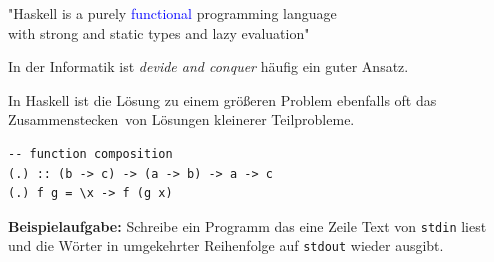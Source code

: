\documentclass[unknownkeysallowed]{beamer}
\begin{document}

\begin{frame}
\begin{center}

  "Haskell is a purely \textcolor{blue}{functional} programming language \\ with strong and static types and lazy evaluation"
  
\end{center}
\end{frame}


\begin{frame}[fragile]

In der Informatik ist \emph{\glqq devide and conquer\grqq} häufig ein guter Ansatz.
 
In Haskell ist die Lösung zu einem größeren Problem ebenfalls oft das \glqq Zusammenstecken\grqq\
von Lösungen kleinerer Teilprobleme.

\pause

\begin{verbatim}
-- function composition
(.) :: (b -> c) -> (a -> b) -> a -> c
(.) f g = \x -> f (g x)
\end{verbatim}

\bigskip
  
\pause 

\textbf{Beispielaufgabe:} Schreibe ein Programm das eine Zeile Text von \texttt{stdin} liest und die  Wörter in umgekehrter Reihenfolge auf \texttt{stdout} wieder ausgibt.

\end{frame} 

\end{document}
